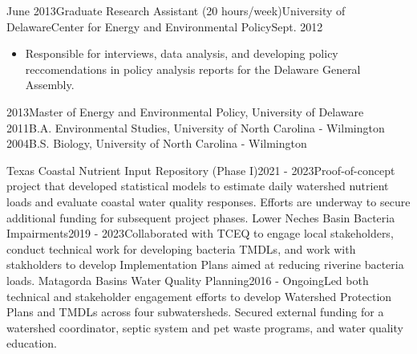 \documentclass[localFont, alternative, showLinks, 11pt,
compact]{yaac-another-awesome-cv}
\begin{document}
\begin{experiences}
{\begin{itemize}
\end{itemize}}
{}
\emptySeparator   \experience
  {June 2013}{Graduate Research Assistant (20 hours/week)}{University of Delaware}{Center for Energy and Environmental Policy}{Sept. 2012}
{\begin{itemize}
 \item Responsible for interviews, data analysis, and developing policy reccomendations in policy analysis reports for the Delaware General Assembly.
\end{itemize}}
{}
\emptySeparator\end{experiences}


\begin{scholarship}  \scholarshipentry
{2013}{Master of Energy and Environmental Policy, University of Delaware}   \scholarshipentry
{2011}{B.A. Environmental Studies, University of North Carolina - Wilmington}   \scholarshipentry
{2004}{B.S. Biology, University of North Carolina - Wilmington}\end{scholarship}


\begin{projects}    \project
  {Texas Coastal Nutrient Input Repository (Phase I)}{2021 - 2023}{}{Proof-of-concept project that developed statistical models to estimate daily watershed nutrient loads and evaluate coastal water quality responses. Efforts are underway to secure additional funding for subsequent project phases.}
{}     \project
  {Lower Neches Basin Bacteria Impairments}{2019 - 2023}{}{Collaborated with TCEQ to engage local stakeholders, conduct technical work for developing bacteria TMDLs, and work with stakholders to develop Implementation Plans aimed at reducing riverine bacteria loads.}
{}     \project
  {Matagorda Basins Water Quality Planning}{2016 - Ongoing}{}{Led both technical and stakeholder engagement efforts to develop Watershed Protection Plans and TMDLs across four subwatersheds. Secured external funding for a watershed coordinator, septic system and pet waste programs, and water quality education.}
{}\end{projects}

\end{document}
